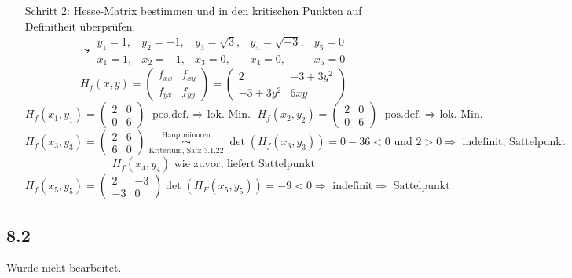 \documentclass[
    accentcolor=pink,
    boxarc,
    dark_mode,
    logofile=enmpty
]{rubos-tuda-template}
\begin{document}
\begin{itemize}
        \item[Schritt 2:]Hesse-Matrix bestimmen und in den kritischen Punkten auf Definitheit überprüfen:
            \[\leadsto \begin{matrix}
                    y_1=1, & y_2=-1, & y_3=\sqrt3, & y_4=\sqrt{-3}, & y_5=0 \\
                    x_1=1, & x_2=-1, & x_3=0,      & x_4=0,         & x_5=0
                \end{matrix}\]
            \[H_f(x,y)=\begin{pmatrix}
                    f_{xx} & f_{xy} \\
                    f_{yx} & f_{yy}
                \end{pmatrix}=%
                \begin{pmatrix}
                    2       & -3+3y^2 \\
                    -3+3y^2 & 6xy
                \end{pmatrix}\]
            \[H_f(x_1,y_1)=\begin{pmatrix}
                    2 & 0 \\
                    0 & 6
                \end{pmatrix}\text{ pos.def. $\Rightarrow$ lok. Min. }%
                H_f(x_2,y_2)=\begin{pmatrix}
                    2 & 0 \\
                    0 & 6
                \end{pmatrix}\text{ pos.def. $\Rightarrow$ lok. Min.}\]
            \[H_f(x_3,y_3)=\begin{pmatrix}
                    2 & 6 \\
                    6 & 0
                \end{pmatrix}\overset{\text{Hauptminoren}}{\underset{\text{Kriterium, Satz 3.1.22}}{\leadsto}}\det(H_f(x_3,y_3))=0-36<0 \text{ und } 2 > 0 \Rightarrow \text{ indefinit, Sattelpunkt}\]
            \[H_f(x_4,y_4)\text{ wie zuvor, liefert Sattelpunkt}\]
            \[H_f(x_5,y_5)=\begin{pmatrix}
                    2  & -3 \\
                    -3 & 0
                \end{pmatrix}\det(H_F(x_5,y_5))=-9<0\Rightarrow\text{ indefinit}\Rightarrow\text{ Sattelpunkt}\]
    \end{itemize}

    \subsection*{8.2}
    \begin{anmerkung}
        Wurde nicht bearbeitet.
    \end{anmerkung}
\end{document}
